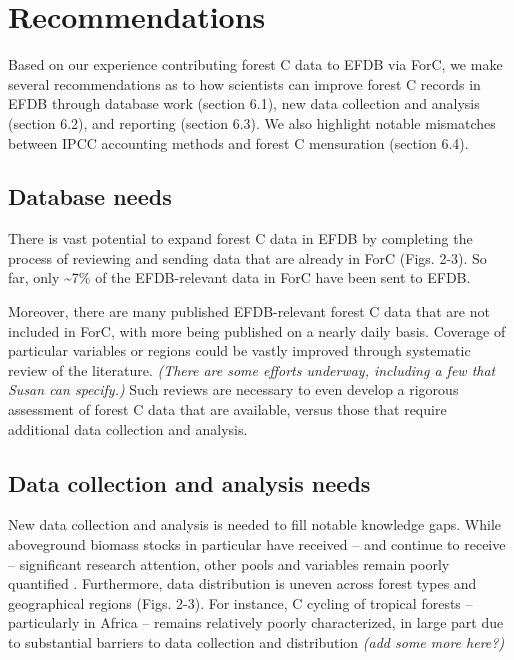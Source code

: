 \documentclass[, manuscript]{copernicus}
\begin{document}
\section{Recommendations}

Based on our experience contributing forest C data to EFDB via ForC, we
make several recommendations as to how scientists can improve forest C
records in EFDB through database work (section 6.1), new data collection
and analysis (section 6.2), and reporting (section 6.3). We also
highlight notable mismatches between IPCC accounting methods and forest
C mensuration (section 6.4).

\subsection{Database needs}

There is vast potential to expand forest C data in EFDB by completing
the process of reviewing and sending data that are already in ForC
(Figs. 2-3). So far, only \textasciitilde7\% of the EFDB-relevant data
in ForC have been sent to EFDB.

Moreover, there are many published EFDB-relevant forest C data that are
not included in ForC, with more being published on a nearly daily basis.
Coverage of particular variables or regions could be vastly improved
through systematic review of the literature. \emph{(There are some
efforts underway, including a few that Susan can specify.)} Such reviews
are necessary to even develop a rigorous assessment of forest C data
that are available, versus those that require additional data collection
and analysis.

\subsection{Data collection and analysis needs}

New data collection and analysis is needed to fill notable knowledge
gaps. While aboveground biomass stocks in particular have received --
and continue to receive -- significant research attention, other pools
and variables remain poorly quantified \citep[Table
2,][]{anderson-teixeira_carbon_2021}. Furthermore, data distribution is
uneven across forest types and geographical regions (Figs. 2-3). For
instance, C cycling of tropical forests -- particularly in Africa --
remains relatively poorly characterized, in large part due to
substantial barriers to data collection and distribution
\citep{delima_making_2022} \emph{(add some more here?)}
\end{document}
